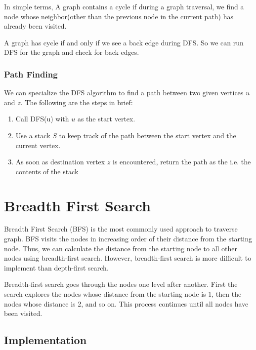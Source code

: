 \documentclass[twoside,12pt,a4paper,english]{book}
\theoremstyle{definition}
\theoremstyle{problemstyle}
\theoremstyle{problemstyle}
\theoremstyle{problemstyle}
\begin{document}

In simple terms, A graph contains a cycle if during a graph traversal, we find a node whose neighbor(other than the previous node in the current path) has already been visited.

A graph has cycle if and only if we see a back edge during DFS. So we can run DFS for the graph and check for back edges.

\subsection{Path Finding}
We can specialize the DFS algorithm to find a path between two given vertices $u$ and $z$. The following are the steps in brief:

\begin{enumerate}
    \item Call DFS(u) with $u$ as the start vertex.
    \item Use a stack $S$ to keep track of the path between the start vertex and the current vertex.
    \item As soon as destination vertex $z$ is encountered, return the path as the i.e. the contents of the stack
\end{enumerate}


\chapter{Breadth First Search}

Breadth First Search (BFS) is the most commonly used approach to traverse graph. BFS visits the nodes in increasing order of their distance
from the starting node. Thus, we can calculate the distance from the starting
node to all other nodes using breadth-first search. However, breadth-first search is more difficult to implement than depth-first search.

Breadth-first search goes through the nodes one level after another. First the
search explores the nodes whose distance from the starting node is 1, then the
nodes whose distance is 2, and so on. This process continues until all nodes have been visited.

\section{Implementation}
\end{document}
